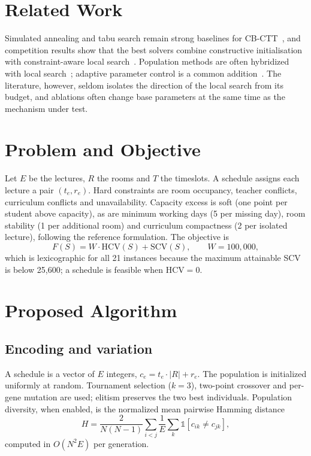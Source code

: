 \documentclass[journal]{IEEEtran}
\begin{document}
\section{Related Work}
Simulated annealing and tabu search remain strong baselines for CB-CTT~\cite{sylejmani2022simulated}, and competition results show that the best solvers combine constructive initialisation with constraint-aware local search~\cite{song2021competition}. Population methods are often hybridized with local search~\cite{rezaeipanah2021hybrid,lacerda2021systematic}; adaptive parameter control is a common addition~\cite{eiben1999parameter}. The literature, however, seldom isolates the direction of the local search from its budget, and ablations often change base parameters at the same time as the mechanism under test.

\section{Problem and Objective}
Let $E$ be the lectures, $R$ the rooms and $T$ the timeslots. A schedule assigns each lecture a pair $(t_e,r_e)$. Hard constraints are room occupancy, teacher conflicts, curriculum conflicts and unavailability. Capacity excess is soft (one point per student above capacity), as are minimum working days (5 per missing day), room stability (1 per additional room) and curriculum compactness (2 per isolated lecture), following the reference formulation. The objective is
\begin{equation}
F(S)=W\cdot \mathrm{HCV}(S)+\mathrm{SCV}(S),\qquad W=100{,}000,
\end{equation}
which is lexicographic for all 21 instances because the maximum attainable SCV is below 25{,}600; a schedule is feasible when $\mathrm{HCV}=0$.

\section{Proposed Algorithm}
\subsection{Encoding and variation}
A schedule is a vector of $E$ integers, $c_e=t_e\cdot|R|+r_e$. The population is initialized uniformly at random. Tournament selection ($k=3$), two-point crossover and per-gene mutation are used; elitism preserves the two best individuals. Population diversity, when enabled, is the normalized mean pairwise Hamming distance
\begin{equation}
H=\frac{2}{N(N-1)}\sum_{i<j}\frac{1}{E}\sum_{k}\mathbb{1}[c_{ik}\neq c_{jk}],
\end{equation}
computed in $O(N^2E)$ per generation.
\end{document}
